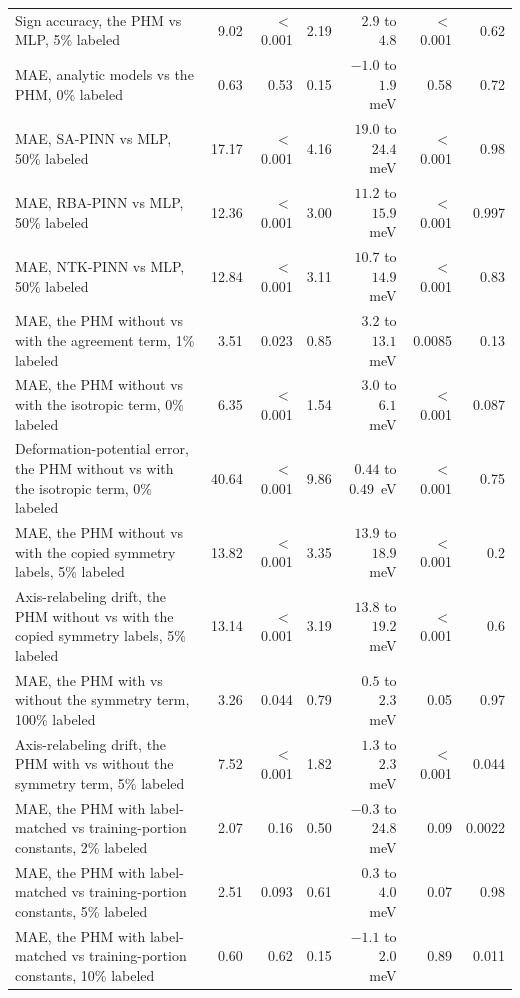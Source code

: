 \begin{tabular}{>{\raggedright\arraybackslash}p{6.2cm}rrrrrr}
Sign accuracy, the PHM vs MLP, 5\% labeled & 9.02 & $<$0.001 & 2.19 & $2.9$ to $4.8$ & $<$0.001 & 0.62 \\
MAE, analytic models vs the PHM, 0\% labeled & 0.63 & 0.53 & 0.15 & $-1.0$ to $1.9$~meV & 0.58 & 0.72 \\
MAE, SA-PINN vs MLP, 50\% labeled & 17.17 & $<$0.001 & 4.16 & $19.0$ to $24.4$~meV & $<$0.001 & 0.98 \\
MAE, RBA-PINN vs MLP, 50\% labeled & 12.36 & $<$0.001 & 3.00 & $11.2$ to $15.9$~meV & $<$0.001 & 0.997 \\
MAE, NTK-PINN vs MLP, 50\% labeled & 12.84 & $<$0.001 & 3.11 & $10.7$ to $14.9$~meV & $<$0.001 & 0.83 \\
MAE, the PHM without vs with the agreement term, 1\% labeled & 3.51 & 0.023 & 0.85 & $3.2$ to $13.1$~meV & 0.0085 & 0.13 \\
MAE, the PHM without vs with the isotropic term, 0\% labeled & 6.35 & $<$0.001 & 1.54 & $3.0$ to $6.1$~meV & $<$0.001 & 0.087 \\
Deformation-potential error, the PHM without vs with the isotropic term, 0\% labeled & 40.64 & $<$0.001 & 9.86 & $0.44$ to $0.49$~eV & $<$0.001 & 0.75 \\
MAE, the PHM without vs with the copied symmetry labels, 5\% labeled & 13.82 & $<$0.001 & 3.35 & $13.9$ to $18.9$~meV & $<$0.001 & 0.2 \\
Axis-relabeling drift, the PHM without vs with the copied symmetry labels, 5\% labeled & 13.14 & $<$0.001 & 3.19 & $13.8$ to $19.2$~meV & $<$0.001 & 0.6 \\
MAE, the PHM with vs without the symmetry term, 100\% labeled & 3.26 & 0.044 & 0.79 & $0.5$ to $2.3$~meV & 0.05 & 0.97 \\
Axis-relabeling drift, the PHM with vs without the symmetry term, 5\% labeled & 7.52 & $<$0.001 & 1.82 & $1.3$ to $2.3$~meV & $<$0.001 & 0.044 \\
MAE, the PHM with label-matched vs training-portion constants, 2\% labeled & 2.07 & 0.16 & 0.50 & $-0.3$ to $24.8$~meV & 0.09 & 0.0022 \\
MAE, the PHM with label-matched vs training-portion constants, 5\% labeled & 2.51 & 0.093 & 0.61 & $0.3$ to $4.0$~meV & 0.07 & 0.98 \\
MAE, the PHM with label-matched vs training-portion constants, 10\% labeled & 0.60 & 0.62 & 0.15 & $-1.1$ to $2.0$~meV & 0.89 & 0.011 \\
\bottomrule
\end{tabular}
